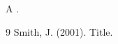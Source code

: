 \documentclass{article}
\begin{document}
A .
\begin{thebibliography}{9}
 Smith, J. (2001). Title.
\end{thebibliography}
\end{document}
